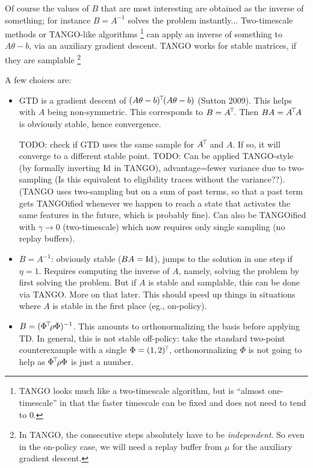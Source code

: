 \documentclass[11pt,a4paper]{article}
\begin{document}
Of course the values of $B$ that are most interesting are obtained as the
inverse of something; for instance $B=A^{-1}$ solves the problem
instantly... Two-timescale methods or TANGO-like algorithms
\footnote{TANGO looks much like a two-timescale algorithm, but is
``almost one-timescale'' in that the faster timescale can be fixed and
does not need to tend to $0$.} can apply an
inverse of something to $A\theta-b$, via an auxiliary gradient descent.
TANGO works for stable matrices, if they are samplable \footnote{In
TANGO, the consecutive steps absolutely have to be \emph{independent}. So even in
the on-policy case, we will need a replay buffer from $\mu$ for the auxiliary
gradient descent.}

A few choices are:
\begin{itemize}
\item GTD is a gradient descent of
$(A\theta-b)^{\!\top}\!(A\theta-b)$ (Sutton 2009). This helps with $A$ being non-symmetric.
This corresponds to $B=A^{\!\top}\!$. Then
$BA=A^{\!\top}\!A$ is
obviously stable, hence convergence.

TODO: check if
GTD uses the same sample for $A^{\!\top}\!$ and $A$. If so, it will
converge to a different stable point. TODO: Can be applied TANGO-style
(by formally inverting $\operatorname{Id}$ in TANGO), advantage=fewer variance due to
two-sampling (Is this equivalent to eligibility traces without the
variance??). (TANGO uses two-sampling but on a sum of past terms, so
that a past term gets TANGOified whenever we happen to reach a state that
activates the same features in the future, which is probably fine). Can
also be TANGOified with $\gamma\to 0$ (two-timescale) which now requires
only single sampling (no replay buffers).

\item $B=A^{-1}$: obviously stable ($BA=\operatorname{Id}$), jumps to the solution in one step if
$\eta=1$. Requires computing the inverse of $A$, namely, solving the
problem by first solving the problem. But if $A$ is stable and samplable,
this can be done via TANGO. More on that later. This should speed up
things in situations where $A$ is stable in the first place (eg.,
on-policy).

\item $B=(\Phi^{\!\top}\!\rho\Phi)^{-1}$. This amounts to orthonormalizing
the basis before applying TD. In general, this is not stable off-policy: take the
standard two-point counterexample with a single $\Phi=(1,2)^{\!\top}\!$,
orthonormalizing $\Phi$ is not going to help as $\Phi^{\!\top}\!\rho\Phi$
is just a number.


\end{itemize}
\end{document}

